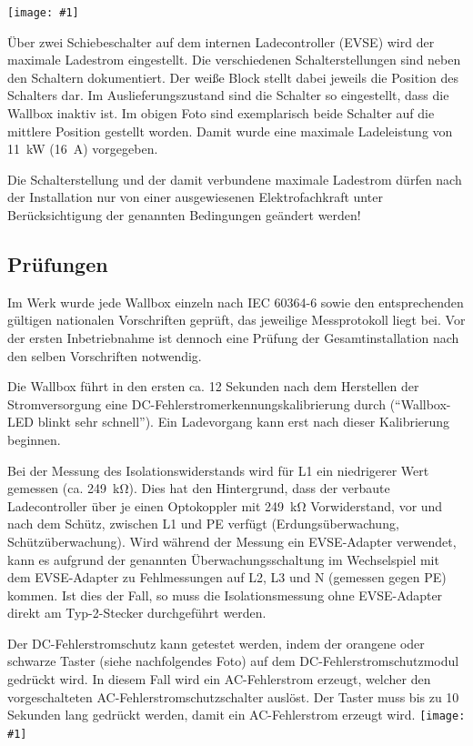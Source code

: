 \documentclass[a4paper,10pt]{article}
\newcommand{\hint}[1]{\begin{tcolorbox}[colback=boxgray,colframe=black,coltext=
white,title=Hinweis]#1\end{tcolorbox}}
\newcommand{\gfx}[1]{\texttt{[image: \#1]}}
\begin{document}
\begin{multicols*}{2}
	\gfx{./img/resized/warp_evse_switch_cut_ready_small}

	Über zwei Schiebeschalter auf dem internen Ladecontroller (EVSE) wird der
	maximale Ladestrom eingestellt. Die verschiedenen Schalterstellungen sind neben
	den Schaltern dokumentiert. Der weiße Block stellt dabei jeweils die Position
	des Schalters dar. Im Auslieferungszustand sind die Schalter so eingestellt,
	dass die Wallbox inaktiv ist. Im obigen Foto sind exemplarisch beide
	Schalter auf die mittlere Position gestellt worden. Damit wurde eine
	maximale Ladeleistung von \SI{11}{\kilo\watt} (\SI{16}{\ampere}) vorgegeben.
	\hint{Die Schalterstellung und der damit verbundene maximale Ladestrom dürfen nach der
		Installation nur von einer ausgewiesenen Elektrofachkraft unter
		Berücksichtigung der genannten Bedingungen geändert werden!}

	\subsection{Prüfungen}\label{tests}
	Im Werk wurde jede Wallbox einzeln nach IEC 60364-6 sowie den entsprechenden gültigen
	nationalen Vorschriften geprüft, das jeweilige Messprotokoll liegt bei.
	Vor der ersten Inbetriebnahme ist dennoch eine Prüfung der Gesamtinstallation
	nach den selben Vorschriften notwendig.

	Die Wallbox führt in den ersten ca. 12 Sekunden nach dem Herstellen der Stromversorgung
	eine DC-Fehlerstromerkennungskalibrierung durch (\enquote{Wallbox-LED blinkt sehr schnell}).
	Ein Ladevorgang kann erst nach dieser Kalibrierung beginnen.

	Bei der Messung des Isolationswiderstands wird für L1 ein niedrigerer Wert
	gemessen (ca. \SI{249}{\kilo\ohm}). Dies hat den Hintergrund, dass
	der verbaute Ladecontroller über je einen Optokoppler mit
	\SI{249}{\kilo\ohm} Vorwiderstand, vor und nach dem Schütz, zwischen L1 und
	PE verfügt (Erdungsüberwachung, Schützüberwachung). Wird während der Messung ein EVSE-Adapter verwendet,
	kann es aufgrund der genannten Überwachungsschaltung im Wechselspiel mit dem EVSE-Adapter zu Fehlmessungen
	auf L2, L3 und N (gemessen gegen PE) kommen. Ist dies der Fall, so muss die Isolationsmessung
	ohne EVSE-Adapter direkt am Typ-2-Stecker durchgeführt werden.

	Der DC-Fehlerstromschutz kann getestet werden, indem der orangene oder schwarze Taster (siehe
	nachfolgendes Foto) auf dem DC-Fehlerstromschutzmodul gedrückt wird. In diesem
	Fall wird ein AC-Fehlerstrom erzeugt, welcher den vorgeschalteten
	AC-Fehlerstromschutzschalter auslöst. Der Taster muss bis zu 10 Sekunden lang gedrückt werden,
	damit ein AC-Fehlerstrom erzeugt wird.
	\vfill
	\gfx{./img/resized/warp_hole_button_ready}

\end{multicols*}
\end{document}
